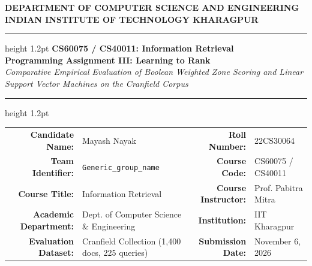 \documentclass[11pt,a4paper]{article}
\begin{document}
\begin{center}
    \vspace*{0.2em}
    {\large \textbf{DEPARTMENT OF COMPUTER SCIENCE AND ENGINEERING}}\\[0.2em]
    {\large \textbf{INDIAN INSTITUTE OF TECHNOLOGY KHARAGPUR}}\\[0.8em]
    
    \hrule height 1.2pt
    \vspace{0.8em}
    {\Large \textbf{CS60075 / CS40011: Information Retrieval}}\\[0.4em]
    {\LARGE \textbf{Programming Assignment III: Learning to Rank}}\\[0.4em]
    {\large \textit{Comparative Empirical Evaluation of Boolean Weighted Zone Scoring and Linear Support Vector Machines on the Cranfield Corpus}}\\[0.8em]
    \hrule height 1.2pt
    \vspace{1.2em}
\end{center}

\begin{table}[H]
\centering
\small
\renewcommand{\arraystretch}{1.25}
\begin{tabularx}{\textwidth}{rXrX}
\toprule
\textbf{Candidate Name:} & Mayash Nayak & \textbf{Roll Number:} & 22CS30064 \\
\textbf{Team Identifier:} & \texttt{Generic\_group\_name} & \textbf{Course Code:} & CS60075 / CS40011 \\
\textbf{Course Title:} & Information Retrieval & \textbf{Course Instructor:} & Prof. Pabitra Mitra \\
\textbf{Academic Department:} & Dept. of Computer Science \& Engineering & \textbf{Institution:} & IIT Kharagpur \\
\textbf{Evaluation Dataset:} & Cranfield Collection (1,400 docs, 225 queries) & \textbf{Submission Date:} & November 6, 2026 \\
\bottomrule
\end{tabularx}
\end{table}

\vspace{0.6em}
\end{document}
